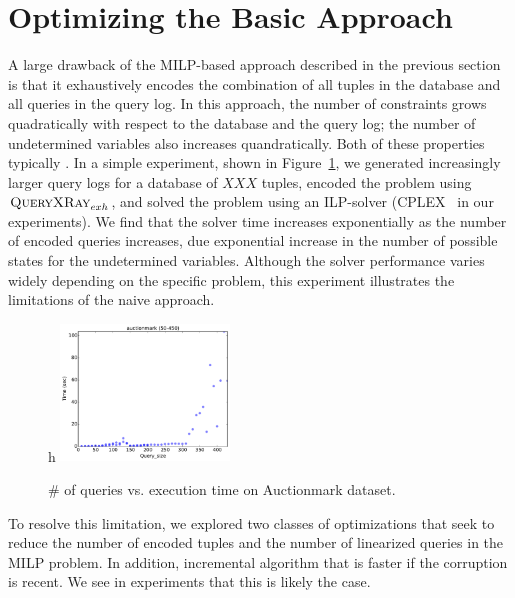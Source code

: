 \section{Optimizing the Basic Approach}
\label{sec:opt}

A large drawback of the MILP-based approach described in the previous section is
that it exhaustively encodes the combination of all tuples in the database and all queries
in the query log.  In this approach, the number of constraints grows quadratically with respect to
the database and the query log; the number of undetermined variables also increases quandratically.
Both of these properties typically .
In a simple experiment, shown in Figure~\ref{fig:querysize_vs_time}, we generated increasingly 
larger query logs for a database of $XXX$ tuples, encoded the problem using $\textsc{QueryXRay}_{exh}$, and solved
the problem using an ILP-solver (CPLEX~\cite{cplex} in our experiments).
We find that the solver time increases exponentially as the number of encoded queries increases,
due exponential increase in the number of possible states for the undetermined variables.
Although the solver performance varies widely depending on the specific problem, this experiment 
illustrates the limitations of the naive approach.

\begin{figure}{h}
    \centering
        \includegraphics[width=0.4\textwidth]{figures/auctionmark_qsize_time}
    \caption{\# of queries vs. execution time on Auctionmark dataset. }
    \label{fig:querysize_vs_time}
\end{figure}

To resolve this limitation, we explored two classes of optimizations that seek to
reduce the number of encoded tuples and the number of linearized queries in the MILP problem.
In addition, incremental algorithm that is faster if the corruption is recent.  
We see in experiments that this is likely the case.






